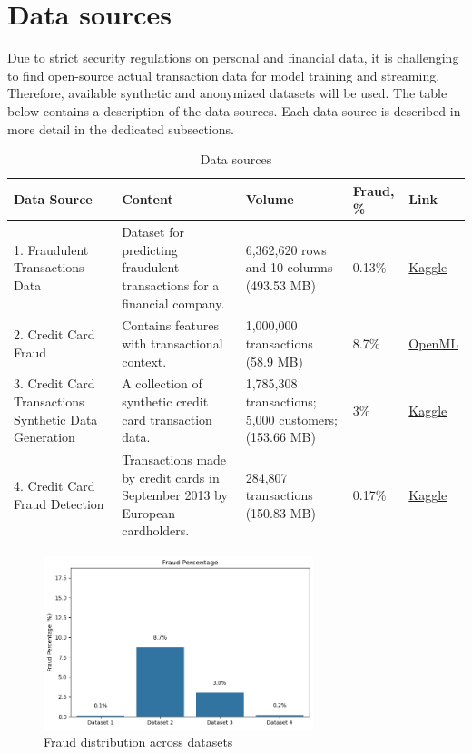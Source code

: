 \documentclass[12pt,a4paper, hidelinks]{article}
\begin{document}
\newpage

\section{Data sources}

Due to strict security regulations on personal and financial data, it is challenging to find open-source actual transaction data for model training and streaming. Therefore, available synthetic and anonymized datasets will be used. The table below contains a description of the data sources. Each data source is described in more detail in the dedicated subsections.

\begin{table}[h!]
\centering


\begin{tabular}{|p{4.8cm}|p{3.5cm}|p{2cm}|p{2cm}|p{1.5cm}|}
\hline
\textbf{Data Source} & \textbf{Content} & \textbf{Volume} &  \textbf{Fraud, \%} & \textbf{Link} \\
\hline
1. Fraudulent Transactions Data &  Dataset for predicting fraudulent transactions for a financial company. &  6,362,620 rows and 10 columns (493.53 MB) & 0.13\% & \href{https://www.kaggle.com/datasets/chitwanmanchanda/fraudulent-transactions-data}{Kaggle} \\
\hline
2. Credit Card Fraud & Contains features with transactional context. & 1,000,000 transactions (58.9 MB) & 8.7\% & \href{https://www.openml.org/search?type=data\&status=active\&id=45955}{OpenML} \\
\hline
3. Credit Card Transactions Synthetic Data Generation & A collection of synthetic credit card transaction data. & 1,785,308 transactions; 5,000 customers; (153.66 MB) & 3\% & \href{https://www.kaggle.com/datasets/cgrodrigues/credit-card-transactions-synthetic-data-generation?select=transactions_df.csv}{Kaggle} \\
\hline
4. Credit Card Fraud Detection & Transactions made by credit cards in September 2013 by European cardholders. & 284,807 transactions (150.83 MB) & 0.17\% & \href{https://www.kaggle.com/datasets/mlg-ulb/creditcardfraud}{Kaggle} \\
\hline
\end{tabular}

\caption{Data sources}
\end{table}

\begin{figure}[h!]
    \centering
    \includegraphics[width=0.7\textwidth]{images/fraud-distribution.png}
    \caption{Fraud distribution across datasets}
    \label{fig:fraudDistribution}
\end{figure}
\end{document}
